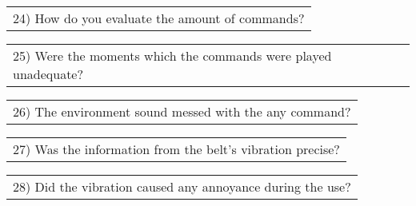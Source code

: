 \begin{table}[!thb]
    \begin{tabular}{m{1\linewidth}}
        \vspace{1ex}
        24)	How do you evaluate the amount of commands?
    \end{tabular}

    
    

    \begin{tabular}{m{1\linewidth}}
        \vspace{1ex}
        25)	Were the moments which the commands were played unadequate?
    \end{tabular}

    
    

    \begin{tabular}{m{1\linewidth}}
        \vspace{1ex}
        26)	The environment sound messed with the any command?
    \end{tabular}

    
    

    \begin{tabular}{m{1\linewidth}}
        \vspace{1ex}
        27)	Was the information from the belt's vibration precise?
    \end{tabular}

    
    

    \begin{tabular}{m{1\linewidth}}
        \vspace{1ex}
        28)	Did the vibration caused any annoyance during the use?
    \end{tabular}

    
    

\end{table}

\FloatBarrier

